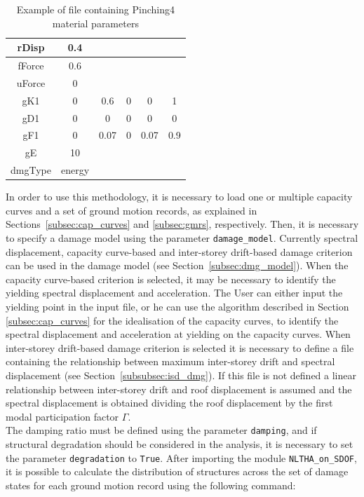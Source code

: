 \begin {table}[htb]
\caption{Example of file containing Pinching4 material parameters}
\label{table:pinching4}
\begin{center}
  \begin{tabular}{ | c | c | c | c | c | c |}
  \hline
	rDisp  & 0.4	&	&	&	 &	\\ \hline
	fForce	 & 0.6 &	&	&	 &	\\ \hline
	uForce	 & 0	&	&	&	 &	\\ \hline
	gK1	 & 0  &	0.6  &	0  &	0	 & 1\\ \hline
	gD1	 & 0	 & 0  &	0  &	0  &	0\\ \hline
	gF1	 & 0  &	0.07	 & 0  &	0.07  &	0.9\\ \hline
	gE	 & 10 &	&	&	 &\\ \hline
	dmgType	& energy &	&	&	 &\\ \hline
	\end{tabular}
\end{center}
\end{table}			

In order to use this methodology, it is necessary to load one or multiple capacity curves and a set of ground motion records, as explained in Sections~\ref{subsec:cap_curves} and \ref{subsec:gmrs}, respectively. Then, it is necessary to specify a damage model using the parameter \verb=damage_model=. 
Currently spectral displacement, capacity curve-based and inter-storey drift-based damage criterion can be used in the damage model (see Section~\ref{subsec:dmg_model}). When the capacity curve-based criterion is selected, it may be necessary to identify the yielding spectral displacement and acceleration. The User can either input the yielding point in the input file, or he can use the algorithm described in Section \ref{subsec:cap_curves} for the idealisation of the capacity curves, to identify the spectral displacement and acceleration at yielding on the capacity curves. When inter-storey drift-based damage criterion is selected it is necessary to define a file containing the relationship between maximum inter-storey drift and spectral displacement (see Section~\ref{subsubsec:isd_dmg}). If this file is not defined a linear relationship between inter-storey drift and roof displacement is assumed and the spectral displacement is obtained dividing the roof displacement by the first modal participation factor $\Gamma$. \\

The damping ratio must be defined using the parameter \verb=damping=, and if structural degradation should be considered in the analysis, it is necessary to set the parameter \verb=degradation= to \verb=True=. After importing the module \verb=NLTHA_on_SDOF=, it is possible to calculate the distribution of structures across the set of damage states for each ground motion record using the following command:

